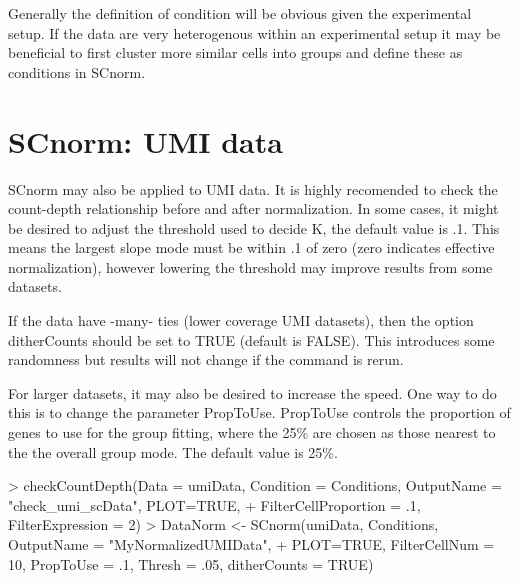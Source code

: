 \documentclass{article}
\begin{document}
Generally the definition of condition will be obvious given the experimental setup. If the data are very heterogenous within an experimental setup it may be beneficial to first cluster more similar cells into groups and define these as conditions in SCnorm.

\section{SCnorm: UMI data}
SCnorm may also be applied to UMI data. It is highly recomended to check the count-depth relationship before and after normalization. In some cases, it might be desired to adjust the threshold used to decide K, the default value is .1. This means the largest slope mode must be within .1 of zero (zero indicates effective normalization), however lowering the threshold may improve results from some datasets. 

If the data have -many- ties (lower coverage UMI datasets), then the option ditherCounts should be set to TRUE (default is FALSE). This introduces some randomness but results will not change if the command is rerun.

For larger datasets, it may also be desired to increase the speed. One way to do this is to change the parameter PropToUse. PropToUse controls the proportion of genes to use for the group fitting, where the 25\% are chosen as those nearest to the the overall group mode. The default value is 25\%. 

\begin{Schunk}
\begin{Sinput}
> checkCountDepth(Data = umiData, Condition = Conditions, OutputName = "check_umi_scData", PLOT=TRUE,
+ FilterCellProportion = .1, FilterExpression = 2)
> DataNorm <- SCnorm(umiData, Conditions, OutputName = "MyNormalizedUMIData",
+ PLOT=TRUE, FilterCellNum = 10, PropToUse = .1, Thresh = .05, ditherCounts = TRUE)
\end{Sinput}
\end{Schunk}
\end{document}
